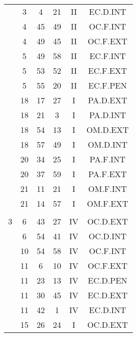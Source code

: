 \documentclass[12pt, a4paper]{article}
\begin{document}
\begin{multicols}{3}
{\begin{tabular}{c c c c c c}
	 	 	 	 & 3 & 4 & 21 & II & EC.D.INT\\%
	 	 	 	 & 4 & 45 & 49 & II & OC.F.INT\\%
	 	 	 	 & 4 & 49 & 45 & II & OC.F.EXT\\%
	 	 	 	 & 5 & 49 & 58 & II & EC.F.INT\\%
	 	 	 	 & 5 & 53 & 52 & II & EC.F.EXT\\%
	 	 	 	 & 5 & 55 & 20 & II & EC.F.PEN\\%
	 	 	 	 & 18 & 17 & 27 & I & PA.D.EXT\\%
	 	 	 	 & 18 & 21 & 3 & I & PA.D.INT\\%
	 	 	 	 & 18 & 54 & 13 & I & OM.D.EXT\\%
	 	 	 	 & 18 & 57 & 49 & I & OM.D.INT\\%
	 	 	 	 & 20 & 34 & 25 & I & PA.F.INT\\%
	 	 	 	 & 20 & 37 & 59 & I & PA.F.EXT\\%
	 	 	 	 & 21 & 11 & 21 & I & OM.F.INT\\%
	 	 	 	 & 21 & 14 & 57 & I & OM.F.EXT\\%
	 	 	 	 & & & & & \\%
	 	 	 	3 & 6 & 43 & 27 & IV & OC.D.EXT\\%
	 	 	 	 & 6 & 54 & 41 & IV & OC.D.INT\\%
	 	 	 	 & 10 & 54 & 58 & IV & OC.F.INT\\%
	 	 	 	 & 11 & 6 & 10 & IV & OC.F.EXT\\%
	 	 	 	 & 11 & 23 & 13 & IV & EC.D.PEN\\%
	 	 	 	 & 11 & 30 & 45 & IV & EC.D.EXT\\%
	 	 	 	 & 11 & 42 & 1 & IV & EC.D.INT\\%
	 	 	 	 & 15 & 26 & 24 & I & OC.D.EXT\\%

\end{tabular}}
\end{multicols}
\end{document}
